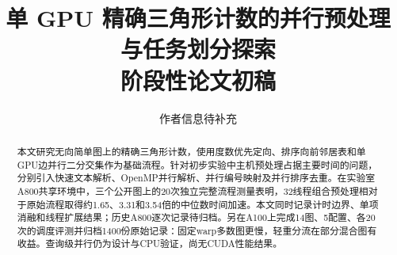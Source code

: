 \documentclass[UTF8,a4paper,11pt,fontset=fandol]{ctexart}
\title{单 GPU 精确三角形计数的并行预处理与任务划分探索\\\large 阶段性论文初稿}
\author{作者信息待补充}
\date{}
\begin{document}
\maketitle
\begin{abstract}
本文研究无向简单图上的精确三角形计数，使用度数优先定向、排序向前邻居表和单GPU边并行二分交集作为基础流程。针对初步实验中主机预处理占据主要时间的问题，分别引入快速文本解析、OpenMP并行解析、并行编号映射及并行排序去重。在实验室A800共享环境中，三个公开图上的20次独立完整流程测量表明，32线程组合预处理相对于原始流程取得约1.65、3.31和3.54倍的中位数时间加速。本文同时记录计时边界、单项消融和线程扩展结果；历史A800逐次记录待归档。另在A100上完成14图、5配置、各20次的调度评测并归档1400份原始记录：固定warp多数图更慢，轻重分流在部分混合图有收益。查询级并行仍为设计与CPU验证，尚无CUDA性能结果。
\end{abstract}






\end{document}
